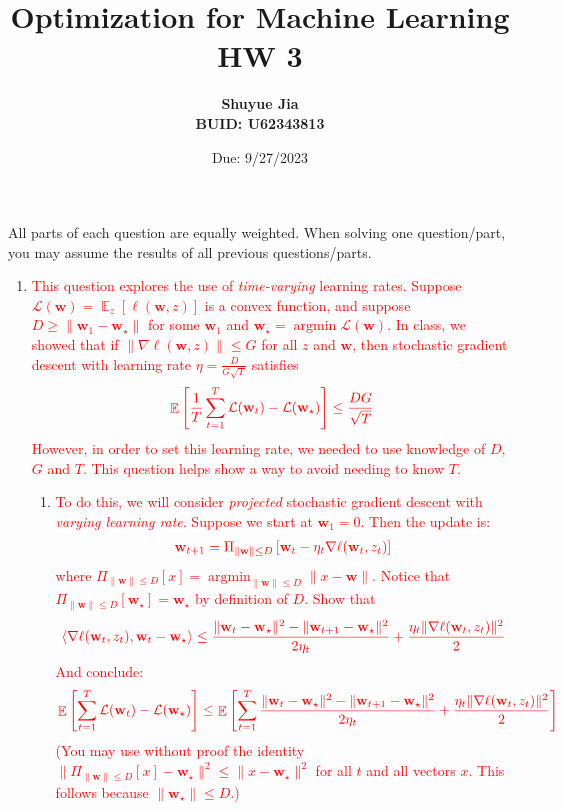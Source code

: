 \documentclass[letterpaper]{article}
\title{Optimization for Machine Learning HW 3}
\author{\textbf{Shuyue Jia} \\ \textbf{BUID: U62343813}}
\date{Due: 9/27/2023}
\newcommand{\E}{\mathop{\mathbb{E}}}
\newcommand{\argmin}{\mathop{\text{argmin}}}
\renewcommand{\L}{\mathcal{L}}
\newcommand{\bw}{\mathbf{w}}
\begin{document}
\maketitle
All parts of each question are equally weighted. When solving one question/part, you may assume the results of all previous questions/parts.
\begin{enumerate}

\item \textcolor{red}{This question explores the use of \emph{time-varying} learning rates. Suppose $\L(\bw) = \E_z [\ell(\bw ,z)]$ is a convex function, and suppose $D\ge \|\bw_1-\bw_\star\|$ for some $\bw_1$ and $\bw_\star =\argmin \L(\bw)$. In class, we showed that if $\|\nabla \ell(\bw,z)\|\le G$ for all $z$ and $\bw$, then stochastic gradient descent with learning rate $\eta=\frac{D}{G\sqrt{T}}$ satisfies}
\begin{align*}
    \textcolor{red}{\E\left[\frac{1}{T}\sum_{t=1}^T \L(\bw_t) -\L(\bw_\star)\right] \le \frac{DG}{\sqrt{T}}}
\end{align*}
\textcolor{red}{However, in order to set this learning rate, we needed to use knowledge of $D$, $G$ and $T$. This question helps show a way to avoid needing to know $T$.}
\begin{enumerate}
    \item \textcolor{red}{To do this, we will consider \emph{projected} stochastic gradient descent with \emph{varying learning rate}. Suppose we start at $\bw_1=0$. Then the update is:}
    \begin{align*}
        \textcolor{red}{\bw_{t+1} = \Pi_{\|\bw\|\le D} \left[\bw_t - \eta_t \nabla \ell(\bw_t,z_t)\right]}
    \end{align*}
    \textcolor{red}{where $\Pi_{\|\bw\|\le D}[x]=\argmin_{\|\bw\|\le D} \|x-\bw\|$. Notice that $\Pi_{\|\bw\|\le D}[\bw_\star]=\bw_\star$ by definition of $D$. Show that}
    \begin{align*}
        \textcolor{red}{\langle \nabla \ell(\bw_t,z_t),\bw_t-\bw_\star\rangle\le \frac{\|\bw_t-\bw_\star\|^2-\|\bw_{t+1}-\bw_\star\|^2}{2\eta_t} + \frac{\eta_t\|\nabla \ell(\bw_t,z_t)\|^2}{2}}
    \end{align*}
    \textcolor{red}{And conclude:}
    \begin{align*}
        \textcolor{red}{\E\left[\sum_{t=1}^T \L(\bw_t)-\L(\bw_\star)\right] \le \E\left[\sum_{t=1}^T \frac{\|\bw_t-\bw_\star\|^2-\|\bw_{t+1}-\bw_\star\|^2}{2\eta_t} + \frac{\eta_t\|\nabla \ell(\bw_t,z_t)\|^2}{2}\right]}
    \end{align*}
    \textcolor{red}{(You may use without proof the identity $\| \Pi_{\|\bw\|\le D}[x]-\bw_\star\|^2\le \|x-\bw_\star\|^2 $ for all $t$ and all vectors $x$. This follows because $\|\bw_\star\|\le D$.)}
    

\end{enumerate}
\end{enumerate}
\end{document}
